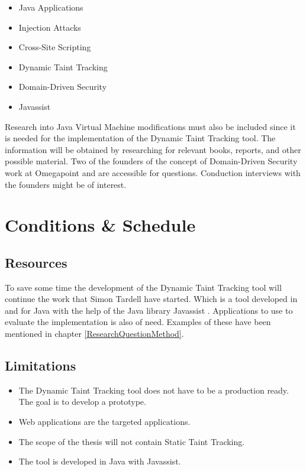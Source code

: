 \documentclass{../kththesis}
\begin{document}
			\begin{itemize}  
					\item Java Applications
					\item Injection Attacks
					\item Cross-Site Scripting
					\item Dynamic Taint Tracking
					\item Domain-Driven Security
					\item Javassist
			\end{itemize}
	
	\noindent
	Research into Java Virtual Machine modifications must also be included since it is needed for the implementation of the Dynamic Taint Tracking tool. The information will be obtained by researching for relevant books, reports, and other possible material. Two of the founders of the concept of Domain-Driven Security work at Omegapoint and are accessible for questions. Conduction interviews with the founders might be of interest.
	
	
	
	\chapter{Conditions \& Schedule}
	\section{Resources}
	To save some time the development of the Dynamic Taint Tracking tool will continue the work that Simon Tardell have started. Which is a tool developed in and for Java with the help of the Java library Javassist \parencite{Javassist}. Applications to use to evaluate the implementation is also of need. Examples of these have been mentioned in chapter \ref{ResearchQuestionMethod}.
	
	
	\section{Limitations}
	\begin{itemize}  
			\item The Dynamic Taint Tracking tool does not have to be a production ready. The goal is to develop a prototype.
			\item Web applications are the targeted applications.
			\item The scope of the thesis will not contain Static Taint Tracking.
			\item The tool is developed in Java with Javassist.
	\end{itemize}
	
\end{document}
